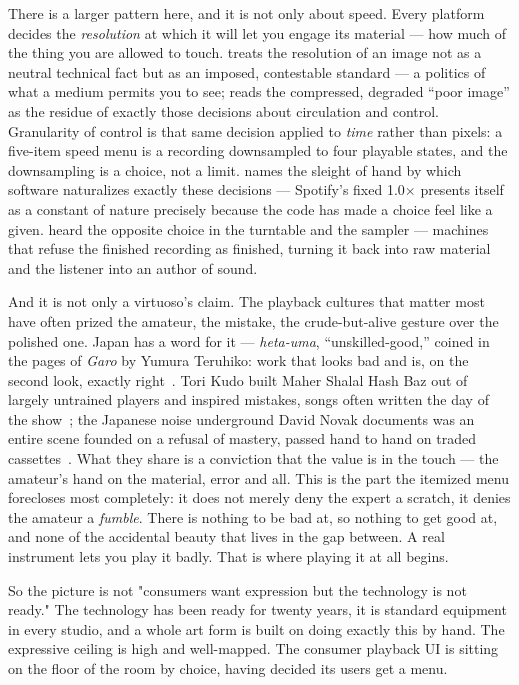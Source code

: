 \documentclass[10pt,letterpaper,twocolumn]{article}
\begin{document}
There is a larger pattern here, and it is not only about speed. Every platform decides the \emph{resolution} at which it will let you engage its material --- how much of the thing you are allowed to touch. \citet{menkman2011glitch} treats the resolution of an image not as a neutral technical fact but as an imposed, contestable standard --- a politics of what a medium permits you to see; \citet{steyerl2009poor} reads the compressed, degraded ``poor image'' as the residue of exactly those decisions about circulation and control. Granularity of control is that same decision applied to \emph{time} rather than pixels: a five-item speed menu is a recording downsampled to four playable states, and the downsampling is a choice, not a limit. \citet{chun2011programmed} names the sleight of hand by which software naturalizes exactly these decisions --- Spotify's fixed 1.0$\times$ presents itself as a constant of nature precisely because the code has made a choice feel like a given. \citet{eshun1998brilliant} heard the opposite choice in the turntable and the sampler --- machines that refuse the finished recording as finished, turning it back into raw material and the listener into an author of sound.

And it is not only a virtuoso's claim. The playback cultures that matter most have often prized the amateur, the mistake, the crude-but-alive gesture over the polished one. Japan has a word for it --- \emph{heta-uma}, ``unskilled-good,'' coined in the pages of \emph{Garo} by Yumura Teruhiko: work that looks bad and is, on the second look, exactly right~\citep{gravett_hetauma}. Tori Kudo built Maher Shalal Hash Baz out of largely untrained players and inspired mistakes, songs often written the day of the show~\citep{kudo_maher}; the Japanese noise underground David Novak documents was an entire scene founded on a refusal of mastery, passed hand to hand on traded cassettes~\citep{novak2013japanoise}. What they share is a conviction that the value is in the touch --- the amateur's hand on the material, error and all. This is the part the itemized menu forecloses most completely: it does not merely deny the expert a scratch, it denies the amateur a \emph{fumble}. There is nothing to be bad at, so nothing to get good at, and none of the accidental beauty that lives in the gap between. A real instrument lets you play it badly. That is where playing it at all begins.

So the picture is not "consumers want expression but the technology is not ready." The technology has been ready for twenty years, it is standard equipment in every studio, and a whole art form is built on doing exactly this by hand. The expressive ceiling is high and well-mapped. The consumer playback UI is sitting on the floor of the room by choice, having decided its users get a menu.
\end{document}
